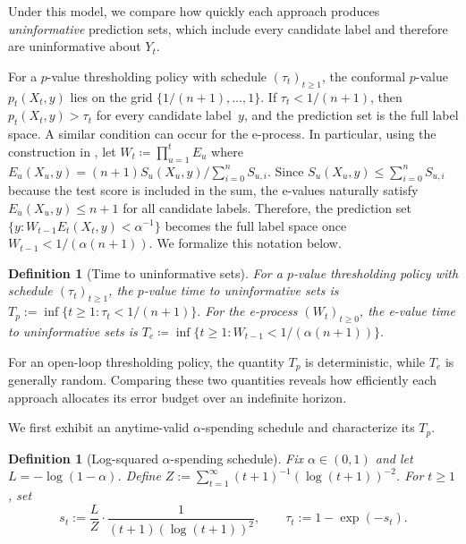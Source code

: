 \documentclass{uai2026} %
\newtheorem{definition}[theorem]{Definition}
\newcommand{\1}{\mathbf{1}}
\newcommand{\eqdef}{\coloneqq}
\begin{document}
Under this model, we compare how quickly each approach produces \emph{uninformative} prediction sets, which include every candidate label and therefore are uninformative about $Y_t$.

For a $p$-value thresholding policy with schedule $(\tau_t)_{t \ge 1}$, the conformal $p$-value $p_t(X_t, y)$ lies on the grid $\{1/(n{+}1), \ldots, 1\}$.
If $\tau_t < 1/(n{+}1)$, then $p_t(X_t, y) > \tau_t$ for every candidate label~$y$, and the prediction set is the full label space.
A similar condition can occur for the e-process. In particular, using the construction in \citet{gauthier2025values}, let $W_t \eqdef
\prod_{u=1}^t E_u$ where $E_u(X_u, y) = (n+1) S_{u}(X_u, y) / \sum_{i=0}^n S_{u,i}$. Since $S_{u}(X_u, y) \le \sum_{i=0}^n S_{u,i}$ because the test score is included in the sum, the e-values naturally satisfy $E_u(X_u,y) \le n+1$ for all candidate labels. Therefore, the prediction set $\{y : W_{t-1} E_t(X_t, y) < \alpha^{-1}\}$ becomes the full label space once $W_{t-1} < 1/(\alpha(n{+}1))$. We formalize this notation below.

\begin{definition}[Time to uninformative sets]
  \label{def:time-uninformative}
  For a $p$-value thresholding policy with schedule $(\tau_t)_{t \ge 1}$, the \emph{$p$-value time to uninformative sets} is $T_p := \inf\{t \ge 1 : \tau_t < 1/(n{+}1)\}.$
  For the e-process $(W_t)_{t \ge 0}$, the \emph{e-value time to uninformative sets} is $T_e \eqdef
  \inf\{t \ge 1 : W_{t-1} < 1/(\alpha(n{+}1))\}.$
\end{definition}

For an open-loop thresholding policy, the quantity $T_p$ is deterministic, while $T_e$ is generally random. Comparing these two quantities reveals how efficiently each approach allocates its error budget over an indefinite horizon.

We first exhibit an anytime-valid $\alpha$-spending schedule and characterize its $T_p$.

\begin{definition}[Log-squared $\alpha$-spending schedule]
  \label{def:log2-spending}
  Fix $\alpha\in(0,1)$ and let $L = -\log(1-\alpha)$.
  Define $Z := \sum_{t=1}^{\infty} (t{+}1)^{-1}(\log(t{+}1))^{-2}$.
  For $t \ge 1$, set
  \begin{equation*}
    s_t := \frac{L}{Z} \cdot \frac{1}{(t{+}1)(\log(t{+}1))^2},
    \qquad
    \tau_t := 1 - \exp(-s_t).
  \end{equation*}
\end{definition}
\end{document}
